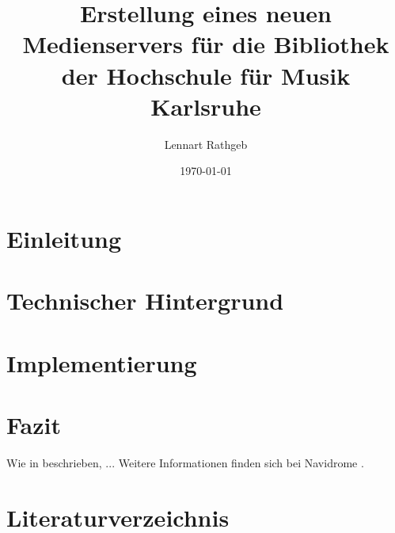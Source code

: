 \documentclass[12pt,a4paper]{article}
\title{Erstellung eines neuen Medienservers für die Bibliothek der Hochschule für Musik Karlsruhe}
\author{Lennart Rathgeb}
\date{\today}
\begin{document}
\maketitle

\tableofcontents
\newpage

\section{Einleitung}

\section{Technischer Hintergrund}

\section{Implementierung}

\section{Fazit}


Wie in \textcite{kuster2005musikinformatik} beschrieben, ...
Weitere Informationen finden sich bei Navidrome \parencite{navidrome2024}.

\section{Literaturverzeichnis}

\printbibliography
\end{document}
